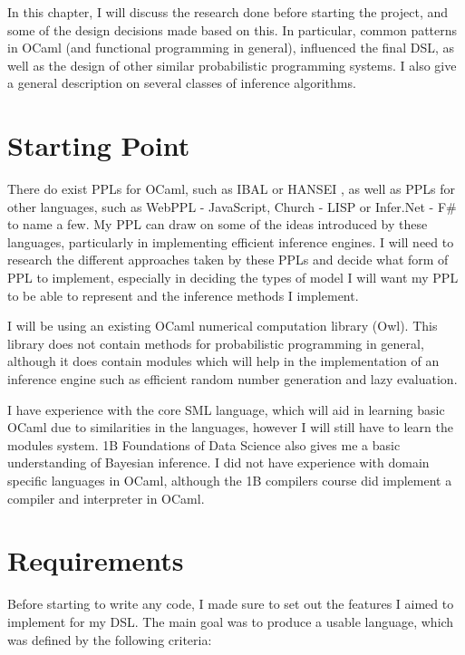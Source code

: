 
In this chapter, I will discuss the research done before starting the project, and some of the design decisions made based on this. In particular, common patterns in OCaml (and functional programming in general), influenced the final DSL, as well as the design of other similar probabilistic programming systems. I also give a general description on several classes of inference algorithms.

\section{Starting Point}

There do exist PPLs for OCaml, such as IBAL \cite{ibal} or HANSEI \cite{kiselyov2009embedded}, as well as PPLs for other languages, such as WebPPL - JavaScript\cite{mobus2018structure}, Church - LISP\cite{goodman2012church} or Infer.Net - F\#\cite{wang2011using} to name a few. My PPL can draw on some of the ideas introduced by these languages, particularly in implementing efficient inference engines. I will need to research the different approaches taken by these PPLs and decide what form of PPL to implement, especially in deciding the types of model I will want my PPL to be able to represent and the inference methods I implement.

I will be using an existing OCaml numerical computation library (Owl). This library does not contain methods for probabilistic programming in general, although it does contain modules which will help in the implementation of an inference engine such as efficient random number generation and lazy evaluation.

I have experience with the core SML language, which will aid in learning basic OCaml due to similarities in the languages, however I will still have to learn the modules system. 1B Foundations of Data Science also gives me a basic understanding of Bayesian inference. I did not have experience with domain specific languages in OCaml, although the 1B compilers course did implement a compiler and interpreter in OCaml.

\section{Requirements}

Before starting to write any code, I made sure to set out the features I aimed to implement for my DSL. The main goal was to produce a usable language, which was defined by the following criteria:

